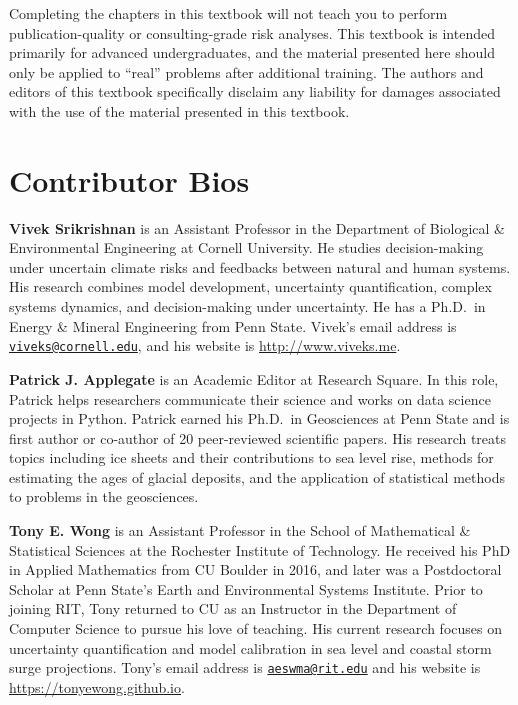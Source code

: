 \documentclass[
  11pt,
]{book}
\begin{document}
\begin{center}

\begin{warning}
Completing the chapters in this textbook will not teach you to perform publication-quality or consulting-grade risk analyses. This textbook is intended primarily for advanced undergraduates, and the material presented here should only be applied to \enquote{real} problems after additional training. The authors and editors of this textbook specifically disclaim any liability for damages associated with the use of the material presented in this textbook.

\end{warning}


\end{center}

\hypertarget{contributor-bios}{%
\section*{Contributor Bios}\label{contributor-bios}}


\textbf{Vivek Srikrishnan} is an Assistant Professor in the Department of Biological \& Environmental Engineering at Cornell University. He studies decision-making under uncertain climate risks and feedbacks between natural and human systems. His research combines model development, uncertainty quantification, complex systems dynamics, and decision-making under uncertainty. He has a Ph.D.~in Energy \& Mineral Engineering from Penn State. Vivek's email address is \href{mailto:viveks@cornell.edu}{\nolinkurl{viveks@cornell.edu}}, and his website is \url{http://www.viveks.me}.

\textbf{Patrick J. Applegate} is an Academic Editor at Research Square. In this role, Patrick helps researchers communicate their science and works on data science projects in Python. Patrick earned his Ph.D.~in Geosciences at Penn State and is first author or co-author of 20 peer-reviewed scientific papers. His research treats topics including ice sheets and their contributions to sea level rise, methods for estimating the ages of glacial deposits, and the application of statistical methods to problems in the geosciences.

\textbf{Tony E. Wong} is an Assistant Professor in the School of Mathematical \& Statistical Sciences at the Rochester Institute of Technology. He received his PhD in Applied Mathematics from CU Boulder in 2016, and later was a Postdoctoral Scholar at Penn State's Earth and Environmental Systems Institute. Prior to joining RIT, Tony returned to CU as an Instructor in the Department of Computer Science to pursue his love of teaching. His current research focuses on uncertainty quantification and model calibration in sea level and coastal storm surge projections. Tony's email address is \href{mailto:aeswma@rit.edu}{\nolinkurl{aeswma@rit.edu}} and his website is \url{https://tonyewong.github.io}.
\end{document}
